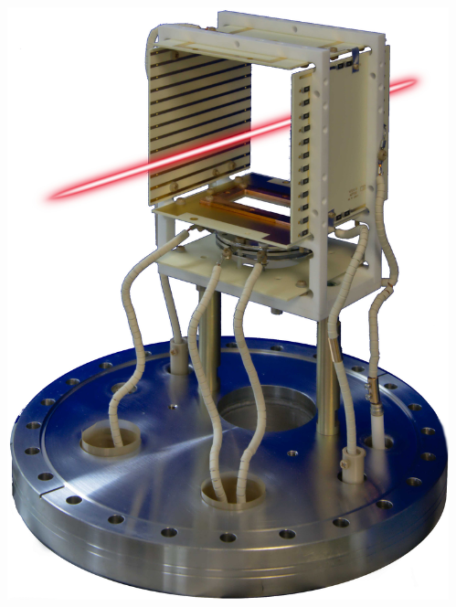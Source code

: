 \begin{frame}[t]
\begin{columns}
\begin{column}{0.45\textwidth}
    \end{column}
    \begin{column}{0.45\textwidth}
      \includegraphics[width=\textwidth]{04_Test/fig/fig000_IPM_photo2}
    \end{column}
  \end{columns}
\end{frame}

